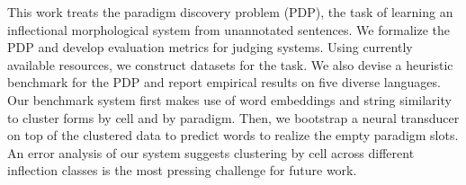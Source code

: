 This work treats the paradigm discovery problem (PDP), the task of learning an inflectional morphological system from unannotated sentences. We formalize the PDP and develop evaluation  metrics for judging systems. Using currently available resources, we construct datasets for the task. We also devise a heuristic benchmark for the PDP and report empirical results on five diverse languages. Our benchmark system first makes use of word embeddings and string similarity to cluster forms by cell and by paradigm. Then, we bootstrap a neural transducer on top of the clustered data to predict words to realize the empty paradigm slots. An error analysis of our system suggests clustering by cell across different inflection classes is the most pressing challenge for future work.
